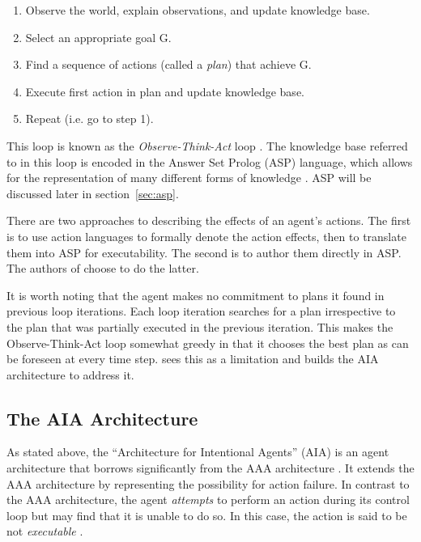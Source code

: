 \begin{enumerate}
    \item Observe the world, explain observations, and update knowledge base.
    \item Select an appropriate goal G.
    \item Find a sequence of actions (called a \textit{plan}) that achieve G.
    \item Execute first action in plan and update knowledge base.
    \item Repeat (i.e. go to step 1).
\end{enumerate}

This loop is known as the \textit{Observe-Think-Act} loop \cite{balduccini_aaa_2008}.
The knowledge base referred to in this loop is encoded in the Answer Set Prolog (ASP) language, which allows for the representation of many different forms of knowledge \cite{balduccini_aaa_2008}.
ASP will be discussed later in section~\ref{sec:asp}.

There are two approaches to describing the effects of an agent’s actions.
The first is to use action languages to formally denote the action effects, then to translate them into ASP for executability.
The second is to author them directly in ASP.
The authors of \cite{balduccini_aaa_2008} choose to do the latter.

It is worth noting that the agent makes no commitment to plans it found in previous loop iterations.
Each loop iteration searches for a plan irrespective to the plan that was partially executed in the previous iteration.
This makes the Observe-Think-Act loop somewhat greedy in that it chooses the best plan as can be foreseen at every time step.
\cite{blount_towards_2014} sees this as a limitation and builds the AIA architecture to address it.

\subsection{The AIA Architecture}
\label{subsec:aia_architecture}

As stated above, the ``Architecture for Intentional Agents'' (AIA) is an agent architecture that borrows significantly from the AAA architecture \cite{blount_towards_2014}.
It extends the AAA architecture by representing the possibility for action failure.
In contrast to the AAA architecture, the agent \textit{attempts} to perform an action during its control loop but may find that it is unable to do so.
In this case, the action is said to be not \textit{executable} \cite{blount_towards_2014}.

